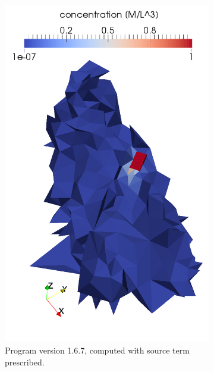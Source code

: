 \begin{figure}[!h]
\begin{subfigure}[b]{0.3\textwidth}
        \includegraphics[width=\textwidth]{tests_graphics/mel_transport_end_167s.pdf}
        \caption{Program version 1.6.7, computed with source term prescribed.}
        \label{fig:bench_mel3b}
    \end{subfigure}
    ~
    \begin{subfigure}[b]{0.3\textwidth}
        \centering

\end{subfigure}
\end{figure}
